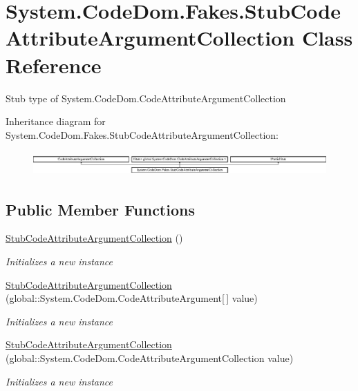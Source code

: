 \hypertarget{class_system_1_1_code_dom_1_1_fakes_1_1_stub_code_attribute_argument_collection}{\section{System.\-Code\-Dom.\-Fakes.\-Stub\-Code\-Attribute\-Argument\-Collection Class Reference}
\label{class_system_1_1_code_dom_1_1_fakes_1_1_stub_code_attribute_argument_collection}
}


Stub type of System.\-Code\-Dom.\-Code\-Attribute\-Argument\-Collection 


Inheritance diagram for System.\-Code\-Dom.\-Fakes.\-Stub\-Code\-Attribute\-Argument\-Collection\-:\begin{figure}[H]
\begin{center}
\leavevmode
\includegraphics[height=0.933333cm]{class_system_1_1_code_dom_1_1_fakes_1_1_stub_code_attribute_argument_collection}
\end{center}
\end{figure}
\subsection*{Public Member Functions}
\begin{DoxyCompactItemize}
\item 
\hyperlink{class_system_1_1_code_dom_1_1_fakes_1_1_stub_code_attribute_argument_collection_a25a20db35b2fa141e4a4acd61ee448ff}{Stub\-Code\-Attribute\-Argument\-Collection} ()
\begin{DoxyCompactList}\small\item\em Initializes a new instance\end{DoxyCompactList}\item 
\hyperlink{class_system_1_1_code_dom_1_1_fakes_1_1_stub_code_attribute_argument_collection_a336b6b03f4b0184246f16265a70ad74b}{Stub\-Code\-Attribute\-Argument\-Collection} (global\-::\-System.\-Code\-Dom.\-Code\-Attribute\-Argument\mbox{[}$\,$\mbox{]} value)
\begin{DoxyCompactList}\small\item\em Initializes a new instance\end{DoxyCompactList}\item 
\hyperlink{class_system_1_1_code_dom_1_1_fakes_1_1_stub_code_attribute_argument_collection_a8efd1f3fadb7e624abe7e0057bac2adf}{Stub\-Code\-Attribute\-Argument\-Collection} (global\-::\-System.\-Code\-Dom.\-Code\-Attribute\-Argument\-Collection value)
\begin{DoxyCompactList}\small\item\em Initializes a new instance\end{DoxyCompactList}\end{DoxyCompactItemize}
